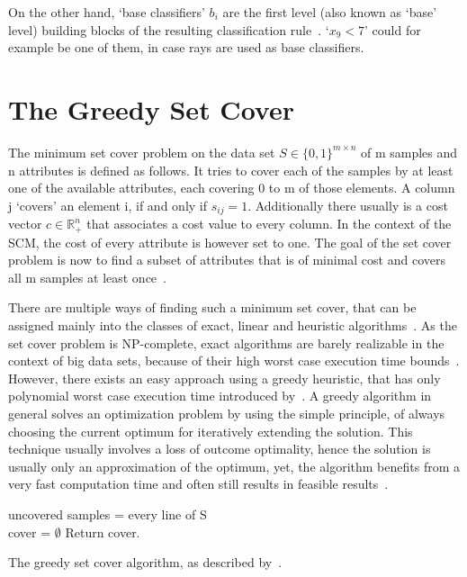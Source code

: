 On the other hand, `base classifiers' \(b_i\) are the first level (also known as `base' level) building blocks of the resulting classification rule~\citep{kestler11}.
`\texttt{\(x_9 < 7\)}' could for example be one of them, in case rays are used as base classifiers. %

\section{The Greedy Set Cover}\label{sec:setCover}

The minimum set cover problem on the data set \(S \in \lbrace0,1\rbrace^{m \times n}\) of m samples and n attributes is defined as follows.
It tries to cover each of the samples by at least one of the available attributes, each covering 0 to m of those elements.
A column j `covers' an element i, if and only if \(s_{ij} = 1\).
Additionally there usually is a cost vector \(c \in \mathbb{R}_{+}^{n} \) that associates a cost value to every column.
In the context of the SCM, the cost of every attribute is however set to one.
The goal of the set cover problem is now to find a subset of attributes that is of minimal cost and covers all m samples at least once~\citep{caprara}.

There are multiple ways of finding such a minimum set cover, that can be assigned mainly into the classes of exact, linear and heuristic algorithms~\citep{caprara}.
As the set cover problem is NP-complete, exact algorithms are barely realizable in the context of big data sets, because of their high worst case execution time bounds~\citep{chvatal}.
However, there exists an easy approach using a greedy heuristic, that has only polynomial worst case execution time introduced by~\cite{chvatal}.
A greedy algorithm in general solves an optimization problem by using the simple principle, 
of always choosing the current optimum for iteratively extending the solution.
This technique usually involves a loss of outcome optimality, hence the solution is usually only an approximation of the optimum,
yet, the algorithm benefits from a very fast computation time and often still results in feasible results~\citep{cormen}.

\begin{algorithm}[ht]
    uncovered samples = every line of S\\
    cover = \(\emptyset\)
    Return cover.
    \caption{The greedy set cover algorithm, as described by~\cite{chvatal}.}\label{code:greedySetCover}
\end{algorithm}


